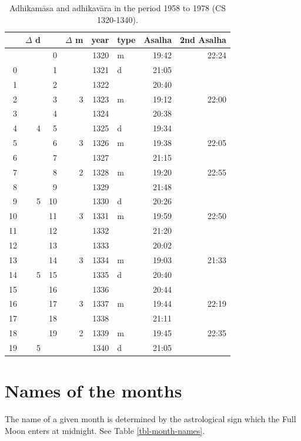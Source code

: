 \documentclass[11pt,oneside]{memoir-article}
\begin{document}
\begin{table}[p]
\caption{Adhikamāsa and adhikavāra in the period 1958 to 1978 (CS 1320-1340).\cite{eade-interpolation}}
\centering
\begin{tabular}{rrrrrlrr}
 & $\Delta$ d &  & $\Delta$ m & year & type & Asalha & 2nd Asalha\\
\hline
 &  & 0 &  & 1320 & m & 19:42 & 22:24\\
0 &  & 1 &  & 1321 & d & 21:05 & \\
1 &  & 2 &  & 1322 &  & 20:40 & \\
2 &  & 3 & 3 & 1323 & m & 19:12 & 22:00\\
3 &  & 4 &  & 1324 &  & 20:38 & \\
4 & 4 & 5 &  & 1325 & d & 19:34 & \\
5 &  & 6 & 3 & 1326 & m & 19:38 & 22:05\\
6 &  & 7 &  & 1327 &  & 21:15 & \\
7 &  & 8 & 2 & 1328 & m & 19:20 & 22:55\\
8 &  & 9 &  & 1329 &  & 21:48 & \\
9 & 5 & 10 &  & 1330 & d & 20:26 & \\
10 &  & 11 & 3 & 1331 & m & 19:59 & 22:50\\
11 &  & 12 &  & 1332 &  & 21:20 & \\
12 &  & 13 &  & 1333 &  & 20:02 & \\
13 &  & 14 & 3 & 1334 & m & 19:03 & 21:33\\
14 & 5 & 15 &  & 1335 & d & 20:40 & \\
15 &  & 16 &  & 1336 &  & 20:44 & \\
16 &  & 17 & 3 & 1337 & m & 19:44 & 22:19\\
17 &  & 18 &  & 1338 &  & 21:11 & \\
18 &  & 19 & 2 & 1339 & m & 19:45 & 22:35\\
19 & 5 &  &  & 1340 & d & 21:05 & \\
\end{tabular}
\end{table}
\section{Names of the months}
\label{sec-3-6}

The name of a given month is determined by the astrological sign which
the Full Moon enters at midnight. See Table \ref{tbl-month-names}.
\end{document}
